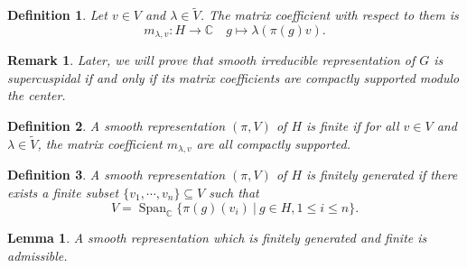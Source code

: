 \documentclass[8pt]{article}
\newtheorem{definition}{Definition}[section]
\newtheorem{lemma}{Lemma}[section]
\newtheorem{remark}{Remark}[section]
\DeclareMathOperator{\Span}{Span}
\newcommand{\C}[0]{\mathbb{C}}
\begin{document}
\begin{definition}
Let $v\in V$ and  $\lambda\in\widetilde{V}$. The matrix coefficient with respect to them is 
\begin{equation*}
m_{\lambda,v}:H\to\C\quad g\mapsto\lambda(\pi(g)v).
\end{equation*}
\end{definition}

\begin{remark}
Later, we will prove that smooth irreducible representation of $G$ is supercuspidal if and only if its matrix coefficients are compactly supported modulo the center.
\end{remark}

\begin{definition}
A smooth representation $(\pi,V)$ of $H$ is finite if for all $v\in V$ and $\lambda\in\widetilde{V}$, the matrix coefficient $m_{\lambda,v}$ are all compactly supported. 
\end{definition}

\begin{definition}
A smooth representation $(\pi,V)$ of $H$ is finitely generated if there exists a finite subset $\{v_1,\cdots,v_n\}\subseteq V$ such that 
\begin{equation*}
V = \Span_\C\{\pi(g)(v_i)\:|\: g\in H,1\leq i\leq n\}.
\end{equation*}
\end{definition}

\begin{lemma}
  \label{admissible_criteria}
  \label{lemma_9}
A smooth representation which is finitely generated and finite is admissible.
\end{lemma}
\end{document}
